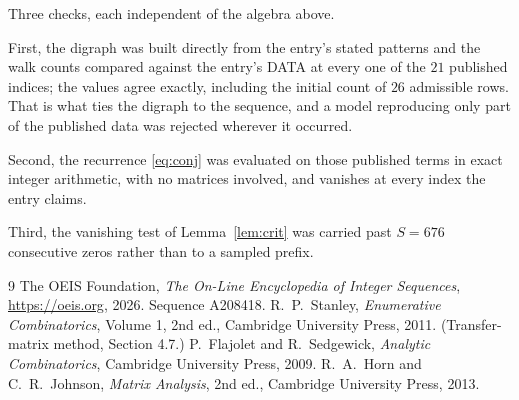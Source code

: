 \documentclass[11pt,a4paper]{article}
\theoremstyle{plain}
\theoremstyle{definition}
\begin{document}
Three checks, each independent of the algebra above.

First, the digraph was built directly from the entry's stated patterns and the walk counts
compared against the entry's DATA at every one of the $21$ published indices; the
values agree exactly, including the initial count of $26$ admissible rows. That is
what ties the digraph to the sequence, and a model reproducing only part of the published
data was rejected wherever it occurred.

Second, the recurrence \eqref{eq:conj} was evaluated on those published terms in exact
integer arithmetic, with no matrices involved, and vanishes at every index the entry claims.

Third, the vanishing test of Lemma~\ref{lem:crit} was carried past $S=676$ consecutive
zeros rather than to a sampled prefix.

\begin{thebibliography}{9}
 The OEIS Foundation, \emph{The On-Line Encyclopedia of Integer
Sequences}, \url{https://oeis.org}, 2026. Sequence A208418.
 R.~P.~Stanley, \emph{Enumerative Combinatorics}, Volume 1, 2nd ed.,
Cambridge University Press, 2011. (Transfer-matrix method, Section 4.7.)
 P.~Flajolet and R.~Sedgewick, \emph{Analytic Combinatorics}, Cambridge
University Press, 2009.
 R.~A.~Horn and C.~R.~Johnson, \emph{Matrix Analysis}, 2nd ed., Cambridge
University Press, 2013.
\end{thebibliography}
\end{document}
